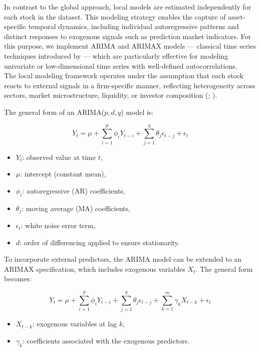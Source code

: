 \documentclass[12pt]{report}
\begin{document}
In contrast to the global approach, local models are estimated independently for each stock in the dataset. This modeling strategy enables the capture of asset-specific temporal dynamics, including individual autoregressive patterns and distinct responses to exogenous signals such as prediction market indicators. For this purpose, we implement ARIMA and ARIMAX models — classical time series techniques introduced by \cite{box_time_2015} — which are particularly effective for modeling univariate or low-dimensional time series with well-defined autocorrelations.\\

The local modeling framework operates under the assumption that each stock reacts to external signals in a firm-specific manner, reflecting heterogeneity across sectors, market microstructure, liquidity, or investor composition (\cite{de_prado_advances_2018}; \cite{tashman_out-of-sample_2000}).

The general form of an ARIMA(\(p, d, q\)) model is:

\[
Y_t = \mu + \sum_{i=1}^{p} \phi_i Y_{t-i} + \sum_{j=1}^{q} \theta_j \epsilon_{t-j} + \epsilon_t
\]

\begin{itemize}
    \item \( Y_t \): observed value at time \( t \),
    \item \( \mu \): intercept (constant mean),
    \item \( \phi_i \): autoregressive (AR) coefficients,
    \item \( \theta_j \): moving average (MA) coefficients,
    \item \( \epsilon_t \): white noise error term,
    \item \( d \): order of differencing applied to ensure stationarity.
\end{itemize}

To incorporate external predictors, the ARIMA model can be extended to an ARIMAX specification, which includes exogenous variables \( X_t \). The general form becomes:

\[
Y_t = \mu + \sum_{i=1}^{p} \phi_i Y_{t-i} + \sum_{j=1}^{q} \theta_j \epsilon_{t-j} + \sum_{k=1}^{m} \gamma_k X_{t-k} + \epsilon_t
\]

\begin{itemize}
    \item \( X_{t-k} \): exogenous variables at lag \( k \),
    \item \( \gamma_k \): coefficients associated with the exogenous predictors.
\end{itemize}
\end{document}
